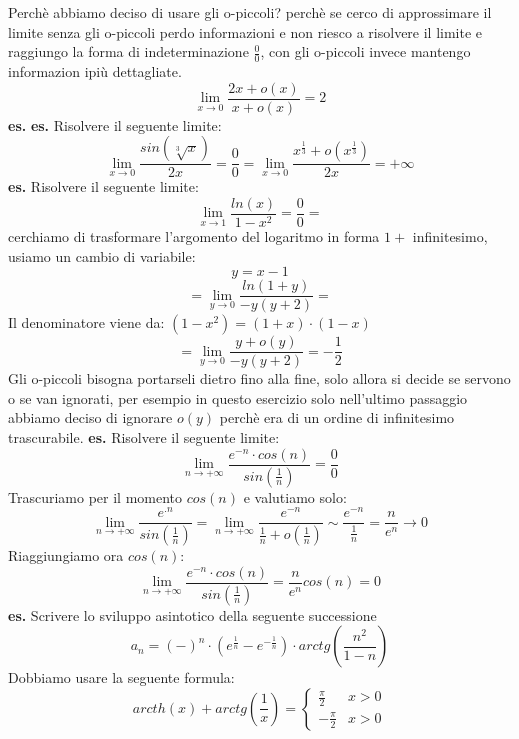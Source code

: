 Perchè abbiamo deciso di usare gli o-piccoli? perchè se cerco di approssimare il limite senza gli o-piccoli perdo informazioni e non riesco a risolvere il limite e raggiungo la forma di indeterminazione $\frac{0}{0}$, con gli o-piccoli invece mantengo informazion ipiù dettagliate.
\[
    \lim_{x\rightarrow 0} \frac{2x+o(x)}{x+o(x)} = 2
\]
\newline
\newline
\textbf{es.} \textbf{es.}  Risolvere il seguente limite:
\[
    \lim_{x\rightarrow 0} \frac{sin(\sqrt[3]{x})}{2x} = \frac{0}{0}= \lim_{x\rightarrow 0} \frac{x^{\frac{1}{3}} + o (x ^{\frac{1}{3}})}{2x} = + \infty
\]
\newline
\newline
\textbf{es.}  Risolvere il seguente limite:
\[
    \lim_{x\rightarrow 1} \frac{ln(x)}{1-x^2} = \frac{0}{0} = 
\]
cerchiamo di trasformare l'argomento del logaritmo in forma $1 +$ infinitesimo, usiamo un cambio di variabile:
\[
    y=x-1
\]
\[
    =\lim_{y\rightarrow 0} \frac{ln(1+y)}{-y(y+2)} =
\]
Il denominatore viene da: $(1-x^2) = (1+x)\cdot(1-x)$
\[
    = \lim_{y\rightarrow 0} \frac{y +o(y)}{-y(y+2)} = -\frac{1}{2}
\]
Gli o-piccoli bisogna portarseli dietro fino alla fine, solo allora si decide se servono o se van ignorati, per esempio in questo esercizio solo nell'ultimo passaggio abbiamo deciso di ignorare $o(y)$ perchè era di un ordine di infinitesimo trascurabile.
\newline
\newline
\newline
\textbf{es.} Risolvere il seguente limite:
\[
    \lim_{n\rightarrow + \infty} \frac{e^{-n} \cdot cos(n)}{sin(\frac{1}{n})} = \frac{0}{0}
\]
Trascuriamo per il momento $cos(n)$ e valutiamo solo:
\[
    \lim_{n\rightarrow + \infty}\frac{e^{.n}}{sin(\frac{1}{n})} = \lim_{n\rightarrow  +\infty} \frac{e^{-n}}{\frac{1}{n} + o (\frac{1}{n})} \sim  \frac{e^{-n}}{\frac{1}{n}} = \frac{n}{e^n} \rightarrow 0
\]
Riaggiungiamo ora $cos(n)$:
\[
    \lim_{n\rightarrow + \infty} \frac{e^{-n} \cdot cos(n)}{sin(\frac{1}{n})} = \frac{n}{e^n}cos(n) = 0
\]
\newline
\newline
\textbf{es.} Scrivere lo sviluppo asintotico della seguente successione
\[
    a_n = (-)^n \cdot  (e^{\frac{1}{n}} - e^{-\frac{1}{n}}) \cdot  arctg(\frac{n^2}{1-n})
\]
Dobbiamo usare la seguente formula:
\[
    arcth(x) + arctg(\frac{1}{x}) = \begin{cases}
        \frac{\pi}{2} & x>0 \\
        -\frac{\pi}{2} & x>0
    \end{cases}
\]
